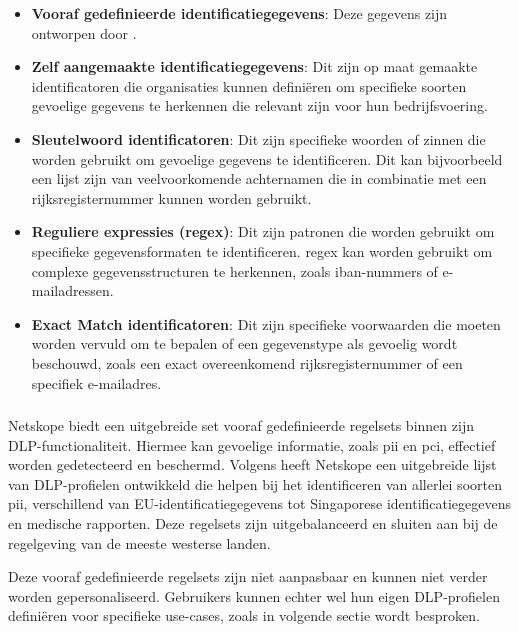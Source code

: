 {\small
\begin{itemize}
    \item \textbf{Vooraf gedefinieerde identificatiegegevens}: Deze gegevens zijn ontworpen door \textcite{Netskope2025DLP}.
    \item \textbf{Zelf aangemaakte identificatiegegevens}: Dit zijn op maat gemaakte identificatoren die organisaties kunnen definiëren om specifieke soorten gevoelige gegevens te herkennen die relevant zijn voor hun bedrijfsvoering.
    \item \textbf{Sleutelwoord identificatoren}: Dit zijn specifieke woorden of zinnen die worden gebruikt om gevoelige gegevens te identificeren. Dit kan bijvoorbeeld een lijst zijn van veelvoorkomende achternamen die in combinatie met een rijksregisternummer kunnen worden gebruikt.
    \item \textbf{Reguliere expressies (regex)}: Dit zijn patronen die worden gebruikt om specifieke gegevensformaten te identificeren. regex kan worden gebruikt om complexe gegevensstructuren te herkennen, zoals \gls{iban}-nummers of e-mailadressen.
    \item \textbf{Exact Match identificatoren}:  Dit zijn specifieke voorwaarden die moeten worden vervuld om te bepalen of een gegevenstype als gevoelig wordt beschouwd, zoals een exact overeenkomend rijksregisternummer of een specifiek e-mailadres.
\end{itemize}
}


\subsubsection{}
\label{subsubsec:vooraf-gedefinieerde-regels-literatuurstudie}

Netskope biedt een uitgebreide set vooraf gedefinieerde regelsets binnen zijn DLP-functionaliteit. 
Hiermee kan gevoelige informatie, zoals \gls{pii} en \gls{pci}, effectief worden gedetecteerd en beschermd.
Volgens \textcite{brouwer2021cloud} heeft Netskope een uitgebreide lijst van DLP-profielen ontwikkeld die helpen bij het identificeren van allerlei soorten \gls{pii},
verschillend van EU-identificatiegegevens tot Singaporese identificatiegegevens en medische rapporten. 
Deze regelsets zijn uitgebalanceerd en sluiten aan bij de regelgeving van de meeste westerse landen. 

Deze vooraf gedefinieerde regelsets zijn niet aanpasbaar en kunnen niet verder worden gepersonaliseerd. 
Gebruikers kunnen echter wel hun eigen DLP-profielen definiëren voor specifieke use-cases, zoals in volgende sectie wordt besproken. 

